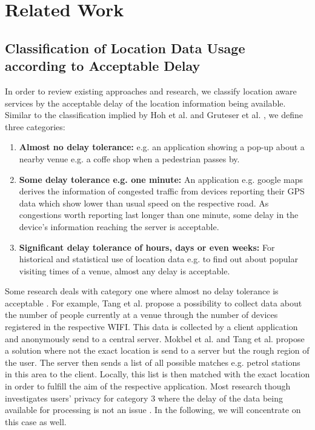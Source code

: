 \chapter{Related Work}\label{chapter:related-work}

\section{Classification of Location Data Usage according to Acceptable Delay}
In order to review existing approaches and research, we classify location aware services by the acceptable delay of the location information being available. Similar to the classification implied by Hoh et al. \parencite{hoh2005protecting} and Gruteser et al. \parencite{gruteser2003anonymous}, we define three categories:
\begin{enumerate}
  \item \textbf{Almost no delay tolerance:} e.g. an application showing a pop-up about a nearby venue e.g. a coffe shop when a pedestrian passes by.
  \item \textbf{Some delay tolerance e.g. one minute:} An application e.g. google maps derives the information of congested traffic from devices reporting their GPS data which show lower than usual speed on the respective road. As congestions worth reporting last longer than one minute, some delay in the device's information reaching the server is acceptable.
  \item \textbf{Significant delay tolerance of hours, days or even weeks:} For historical and statistical use of location data e.g. to find out about popular visiting times of a venue, almost any delay is acceptable.
\end{enumerate}
Some research deals with category one where almost no delay tolerance is acceptable \parencite{location-privacy, mix-zones, tang2006putting}. For example, Tang et al. \parencite{tang2006putting} propose a possibility to collect data about the number of people currently at a venue through the number of devices registered in the respective WIFI. This data is collected by a client application and anonymously send to a central server. Mokbel et al. \parencite{casper} and Tang et al. \parencite{tang2006putting} propose a solution where not the exact location is send to a server but the rough region of the user. The server then sends a list of all possible matches e.g. petrol stations in this area to the client. Locally, this list is then matched with the exact location in order to fulfill the aim of the respective application.
Most research though investigates users' privacy for category 3 where the delay of the data being available for processing is not an issue \parencite{krumm, cellphone, privacy-home-work-pairs, twitter}. In the following, we will concentrate on this case as well.

